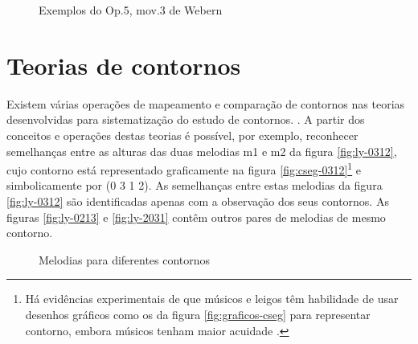 \begin{figure}
  \centering

  \quad
  \caption{Exemplos do Op.5, mov.3 de Webern}
  \label{fig:exemplos-webern}
\end{figure}

\section{Teorias de contornos}
\label{sec:teor-de-cont}

Existem várias operações de mapeamento e comparação de contornos nas
teorias desenvolvidas para sistematização do estudo de contornos.
\cite{friedmann85:methodology,friedmann87:response,morris87:composition,morris93:directions,marvin.ea87:relating,clifford95:contour,polansky.ea92:possible,quinn97:fuzzy,beard03:contour}.
A partir dos conceitos e operações destas teorias é possível, por
exemplo, reconhecer semelhanças entre as alturas das duas melodias m1
e m2 da figura \ref{fig:ly-0312}, cujo contorno está representado
graficamente na figura \ref{fig:cseg-0312}\footnote{Há evidências
  experimentais de que músicos e leigos têm habilidade de usar
  desenhos gráficos como os da figura \ref{fig:graficos-cseg} para
  representar contorno, embora músicos tenham maior acuidade
  \cite[p. 69]{marvin88:generalized}.} e simbolicamente por (0 3 1 2).
As semelhanças entre estas melodias da figura \ref{fig:ly-0312} são
identificadas apenas com a observação dos seus contornos. As figuras
\ref{fig:ly-0213} e \ref{fig:ly-2031} contêm outros pares de melodias
de mesmo contorno.

\begin{figure}
  \centering
  \quad

  \caption{Melodias para diferentes contornos}
  \label{fig:melodias-cseg}
\end{figure}

